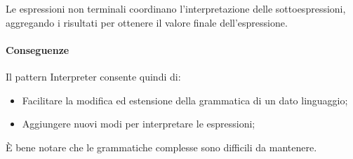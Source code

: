 Le espressioni non terminali coordinano l'interpretazione delle sottoespressioni, aggregando i risultati per ottenere il valore finale dell'espressione.


\paragraph{Conseguenze} Il pattern Interpreter consente quindi di:
\begin{itemize}
    \item Facilitare la modifica ed estensione della grammatica di un dato linguaggio;
    \item Aggiungere nuovi modi per interpretare le espressioni;
\end{itemize}

È bene notare che le grammatiche complesse sono difficili da mantenere.

\newpage
